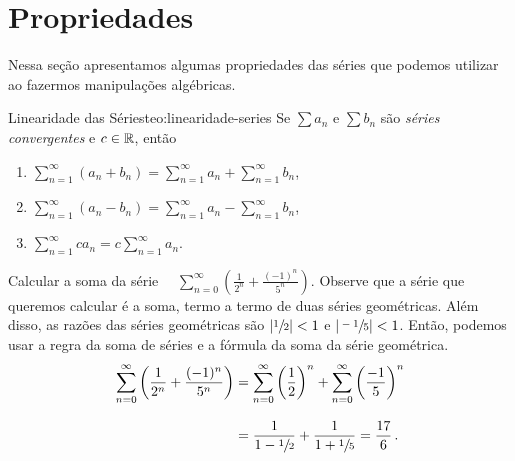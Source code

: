 \section{Propriedades}

Nessa seção apresentamos algumas propriedades das séries que podemos
utilizar ao fazermos manipulações algébricas.

\begin{teorema}{Linearidade das Séries}{teo:linearidade-series}
  Se
  \(\sum a_n\) e \(\sum b_n\)
  são \emph{séries convergentes} e $c\in\mathbb{R}$, então
  \begin{enumerate}[topsep=5mm,itemsep=5mm]
    \item \( \sum_{n=1}^\infty (a_n+b_n) =  \sum_{n=1}^\infty a_n +\sum_{n=1}^\infty b_n \),
    \item \( \sum_{n=1}^\infty (a_n-b_n) =  \sum_{n=1}^\infty a_n -\sum_{n=1}^\infty b_n \),
    \item \( \sum_{n=1}^\infty ca_n      = c\sum_{n=1}^\infty a_n \).
  \end{enumerate}
\end{teorema}

\begin{example}
  Calcular a soma da série
  \(\quad
    \sum_{n=0}^\infty \left(\frac{1}{2^n}+\frac{(-1)^n}{5^n}\right)
  \).
  \solution
  Observe que a série que queremos calcular é a soma, termo a termo de duas séries geométricas.
  Além disso, as razões das séries geométricas são $\abs{\sfrac{1}{2}}<1 $ e $\abs{\sfrac{-1}{5}}<1$.
  Então, podemos usar a regra da soma de séries e a fórmula da soma da série geométrica.
  \begin{align*}
    \sum_{n=0}^\infty \left(\frac{1}{2^n} +\frac{(-1)^n}{5^n}\right)
      & = \sum_{n=0}^\infty \left(\frac{ 1}{2}\right)^n
        + \sum_{n=0}^\infty \left(\frac{-1}{5}\right)^n \\[3mm]
      & = \frac{1}{1-\sfrac{1}{2}} + \frac{1}{1+\sfrac{1}{5}}
        = \frac{17}{6}   \,.
  \end{align*}
\end{example}

